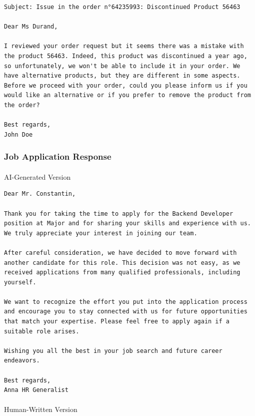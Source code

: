 \documentclass[
]{article}
\makeatletter
\let\oldparagraph\paragraph
\renewcommand{\paragraph}{
    \@ifstar
      \xxxParagraphStar
      \xxxParagraphNoStar
  }
\newcommand{\xxxParagraphStar}[1]{\oldparagraph*{#1}\mbox{}}
\newcommand{\xxxParagraphNoStar}[1]{\oldparagraph{#1}\mbox{}}
\makeatother
\begin{document}
\begin{verbatim}
Subject: Issue in the order n°64235993: Discontinued Product 56463

Dear Ms Durand,

I reviewed your order request but it seems there was a mistake with the product 56463. Indeed, this product was discontinued a year ago, so unfortunately, we won't be able to include it in your order. We have alternative products, but they are different in some aspects.
Before we proceed with your order, could you please inform us if you would like an alternative or if you prefer to remove the product from the order?

Best regards,
John Doe
\end{verbatim}

\subsubsection{Job Application Response}\label{job-application-response}

\paragraph{AI-Generated Version}\label{ai-generated-version-2}

\begin{verbatim}
Dear Mr. Constantin,

Thank you for taking the time to apply for the Backend Developer position at Major and for sharing your skills and experience with us. We truly appreciate your interest in joining our team.

After careful consideration, we have decided to move forward with another candidate for this role. This decision was not easy, as we received applications from many qualified professionals, including yourself.

We want to recognize the effort you put into the application process and encourage you to stay connected with us for future opportunities that match your expertise. Please feel free to apply again if a suitable role arises.

Wishing you all the best in your job search and future career endeavors.

Best regards,
Anna HR Generalist
\end{verbatim}

\paragraph{Human-Written Version}\label{human-written-version-2}
\end{document}
